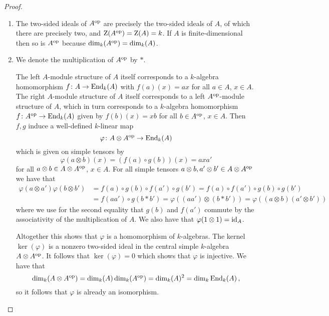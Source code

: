 \begin{proof}
  \leavevmode
  \begin{enumerate}
    \item
      The two-sided ideals of $A^{\mathrm{op}}$ are precisely the two-sided ideals of $A$, of which there are precisely two, and $\operatorname{Z}(A^{\mathrm{op}}) = \operatorname{Z}(A) = k$.
      If $A$ is finite-dimensional then so is $A^{\mathrm{op}}$ because $\dim_k(A^{\mathrm{op}}) = \dim_k(A)$.
    \item
      We denote the multiplication of $A^{\mathrm{op}}$ by $*$.
      
      The left $A$-module structure of $A$ itself corresponds to a $k$-algebra homomorphism $f \colon A \to \operatorname{End}_k(A)$ with $f(a)(x) = ax$ for all $a \in A$, $x \in A$.
      The right $A$-module structure of $A$ itself corresponds to a left $A^{\mathrm{op}}$-module structure of $A$, which in turn corresponds to a $k$-algebra homomorphism $f \colon A^{\mathrm{op}} \to \operatorname{End}_k(A)$ given by $f(b)(x) = xb$ for all $b \in A^{\mathrm{op}}$, $x \in A$.
      Then $f, g$ induce a well-defined $k$-linear map
      \[
                \varphi
        \colon  A \otimes A^{\mathrm{op}}
        \to     \operatorname{End}_k(A)
      \]
      which is given on simple tensors by
      \[
          \varphi(a \otimes b)(x)
        = (f(a) \circ g(b))(x)
        = a x a'
      \]
      for all $a \otimes b \in A \otimes A^{\mathrm{op}}$, $x \in A$.
      For all simple tensors $a \otimes b, a' \otimes b' \in A \otimes A^{\mathrm{op}}$ we have that
      \begin{align*}
            \varphi(a \otimes a') \varphi(b \otimes b')
        &=  f(a) \circ g(b) \circ f(a') \circ g(b')
         =  f(a) \circ f(a') \circ g(b) \circ g(b') \\
        &=  f(a a') \circ g(b * b')
         =  \varphi((a a') \otimes (b * b'))
         =  \varphi((a \otimes b) (a' \otimes b'))
      \end{align*}
      where we use for the second equality that $g(b)$ and $f(a')$ commute by the associativity of the multiplication of $A$.
      We also have that $\varphi(1 \otimes 1) = \operatorname{id}_A$.
      
      Altogether this shows that $\varphi$ is a homomorphism of $k$-algebras.
      The kernel $\ker(\varphi)$ is a nonzero two-sided ideal in the central simple $k$-algebra $A \otimes A^{\mathrm{op}}$.
      It follows that $\ker(\varphi) = 0$ which shows that $\varphi$ is injective.
      We have that
      \[
          \dim_k (A \otimes A^{\mathrm{op}})
        = \dim_k(A) \dim_k(A^{\mathrm{op}})
        = \dim_k(A)^2
        = \dim_k \operatorname{End}_k(A) \,,
      \]
      so it follows that $\varphi$ is already an isomorphism.
    \qedhere
  \end{enumerate}
\end{proof}


